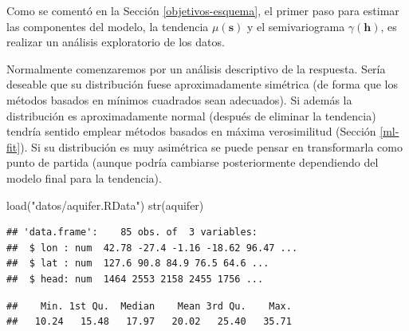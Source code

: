 \documentclass[
  spanish,
]{book}
\newenvironment{Shaded}{\begin{snugshade}}{\end{snugshade}}
\newcommand{\AttributeTok}[1]{\textcolor[rgb]{0.77,0.63,0.00}{#1}}
\newcommand{\DecValTok}[1]{\textcolor[rgb]{0.00,0.00,0.81}{#1}}
\newcommand{\FunctionTok}[1]{\textcolor[rgb]{0.00,0.00,0.00}{#1}}
\newcommand{\NormalTok}[1]{#1}
\newcommand{\OtherTok}[1]{\textcolor[rgb]{0.56,0.35,0.01}{#1}}
\newcommand{\SpecialCharTok}[1]{\textcolor[rgb]{0.00,0.00,0.00}{#1}}
\newcommand{\StringTok}[1]{\textcolor[rgb]{0.31,0.60,0.02}{#1}}
\theoremstyle{break}
\begin{document}
Como se comentó en la Sección \ref{objetivos-esquema}, el primer paso para estimar las componentes del modelo, la tendencia \(\mu(\mathbf{s})\) y el semivariograma \(\gamma(\mathbf{h})\), es realizar un análisis exploratorio de los datos.

Normalmente comenzaremos por un análisis descriptivo de la respuesta.
Sería deseable que su distribución fuese aproximadamente simétrica (de forma que los métodos
basados en mínimos cuadrados sean adecuados).
Si además la distribución es aproximadamente normal (después de eliminar la tendencia) tendría sentido emplear métodos basados en
máxima verosimilitud (Sección \ref{ml-fit}).
Si su distribución es muy asimétrica se puede pensar en transformarla como punto de partida
(aunque podría cambiarse posteriormente dependiendo del modelo final para la tendencia).

\begin{Shaded}
\begin{Highlighting}[]
\FunctionTok{load}\NormalTok{(}\StringTok{"datos/aquifer.RData"}\NormalTok{)}
\FunctionTok{str}\NormalTok{(aquifer)}
\end{Highlighting}
\end{Shaded}

\begin{verbatim}
## 'data.frame':    85 obs. of  3 variables:
##  $ lon : num  42.78 -27.4 -1.16 -18.62 96.47 ...
##  $ lat : num  127.6 90.8 84.9 76.5 64.6 ...
##  $ head: num  1464 2553 2158 2455 1756 ...
\end{verbatim}

\begin{Shaded}
\end{Shaded}

\begin{verbatim}
##    Min. 1st Qu.  Median    Mean 3rd Qu.    Max. 
##   10.24   15.48   17.97   20.02   25.40   35.71
\end{verbatim}
\end{document}

